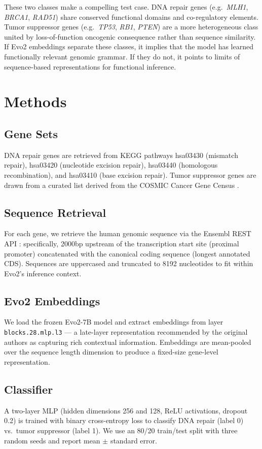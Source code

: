 \documentclass{article}
\begin{document}
These two classes make a compelling test case. DNA repair genes (e.g.\ \textit{MLH1}, \textit{BRCA1}, \textit{RAD51}) share conserved functional domains and co-regulatory elements. Tumor suppressor genes (e.g.\ \textit{TP53}, \textit{RB1}, \textit{PTEN}) are a more heterogeneous class united by loss-of-function oncogenic consequence rather than sequence similarity. If Evo2 embeddings separate these classes, it implies that the model has learned functionally relevant genomic grammar. If they do not, it points to limits of sequence-based representations for functional inference.

\section{Methods}
\label{sec:methods}

\subsection{Gene Sets}
DNA repair genes are retrieved from KEGG pathways hsa03430 (mismatch repair), hsa03420 (nucleotide excision repair), hsa03440 (homologous recombination), and hsa03410 (base excision repair). Tumor suppressor genes are drawn from a curated list derived from the COSMIC Cancer Gene Census \citep{sondka2018cosmic}.

\subsection{Sequence Retrieval}
For each gene, we retrieve the human genomic sequence via the Ensembl REST API \citep{cunningham2022ensembl}: specifically, 2000bp upstream of the transcription start site (proximal promoter) concatenated with the canonical coding sequence (longest annotated CDS). Sequences are uppercased and truncated to 8192 nucleotides to fit within Evo2's inference context.

\subsection{Evo2 Embeddings}
We load the frozen Evo2-7B model \citep{nguyen2024evo2} and extract embeddings from layer \texttt{blocks.28.mlp.l3} — a late-layer representation recommended by the original authors as capturing rich contextual information. Embeddings are mean-pooled over the sequence length dimension to produce a fixed-size gene-level representation.

\subsection{Classifier}
A two-layer MLP (hidden dimensions 256 and 128, ReLU activations, dropout 0.2) is trained with binary cross-entropy loss to classify DNA repair (label 0) vs.\ tumor suppressor (label 1). We use an 80/20 train/test split with three random seeds and report mean $\pm$ standard error.
\end{document}
